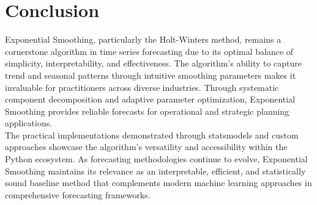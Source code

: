 \section{Conclusion}
\label{sec:conclusion}

Exponential Smoothing, particularly the Holt-Winters method, remains a cornerstone algorithm in time series forecasting due to its optimal balance of simplicity, interpretability, and effectiveness. The algorithm's ability to capture trend and seasonal patterns through intuitive smoothing parameters makes it invaluable for practitioners across diverse industries. Through systematic component decomposition and adaptive parameter optimization, Exponential Smoothing provides reliable forecasts for operational and strategic planning applications.\\

The practical implementations demonstrated through statsmodels and custom approaches showcase the algorithm's versatility and accessibility within the Python ecosystem. As forecasting methodologies continue to evolve, Exponential Smoothing maintains its relevance as an interpretable, efficient, and statistically sound baseline method that complements modern machine learning approaches in comprehensive forecasting frameworks.